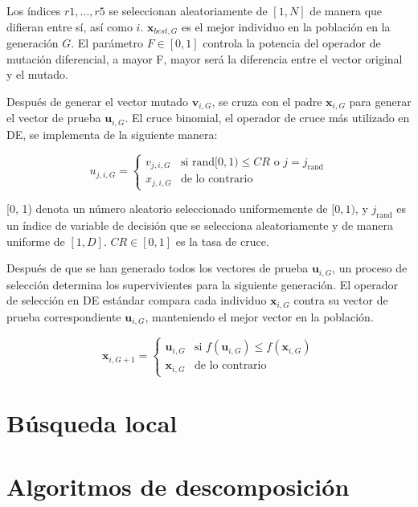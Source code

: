 Los índices \( r1, \ldots, r5 \) se seleccionan aleatoriamente de \([1, N]\) de manera que difieran entre sí, así como \( i \). \( \mathbf{x}_{best,G} \) es el mejor individuo en la población en la generación \( G \). El parámetro \( F \in [0, 1] \) controla la potencia del operador de mutación diferencial, a mayor F, mayor será la diferencia entre el vector original y el mutado.

Después de generar el vector mutado \( \mathbf{v}_{i,G} \), se cruza con el padre \( \mathbf{x}_{i,G} \) para generar el vector de prueba \( \mathbf{u}_{i,G} \). El cruce binomial, el operador de cruce más utilizado en DE, se implementa de la siguiente manera:

\[
u_{j,i,G} =
\begin{cases}
v_{j,i,G} & \text{si } \text{rand}[0, 1) \leq CR \text{ o } j = j_{\text{rand}} \\
x_{j,i,G} & \text{de lo contrario}
\end{cases}
\]

[0, 1) denota un número aleatorio seleccionado uniformemente de \([0, 1)\), y \( j_{\text{rand}} \) es un índice de variable de decisión que se selecciona aleatoriamente y de manera uniforme de \([1, D]\). \( CR \in [0, 1] \) es la tasa de cruce.

Después de que se han generado todos los vectores de prueba \( \mathbf{u}_{i,G} \), un proceso de selección determina los supervivientes para la siguiente generación. El operador de selección en DE estándar compara cada individuo \( \mathbf{x}_{i,G} \) contra su vector de prueba correspondiente \( \mathbf{u}_{i,G} \), manteniendo el mejor vector en la población.

\[
\mathbf{x}_{i,G+1} = 
\begin{cases} 
\mathbf{u}_{i,G} & \text{si } f(\mathbf{u}_{i,G}) \leq f(\mathbf{x}_{i,G}) \\ 
\mathbf{x}_{i,G} & \text{de lo contrario} 
\end{cases} 
\]

\section{Búsqueda local}

\section{Algoritmos de descomposición}

\endinput
